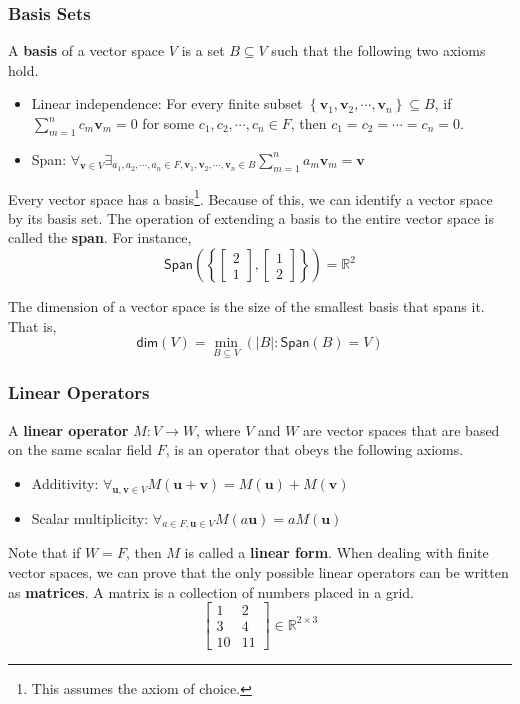 \documentclass[10pt]{beamer}
\begin{document}
\begin{frame}
  \frametitle{Basis Sets}
  A \textbf{basis} of a vector space $V$ is a set $B \subseteq V$ such that the following two axioms hold.
  \begin{itemize}
  \item Linear independence: For every finite subset $\left\{\mathbf{v}_1, \mathbf{v}_2, \cdots, \mathbf{v}_n\right\} \subseteq B$, if $\sum_{m=1}^{n}c_m\mathbf{v}_m = 0$ for some $c_1, c_2, \cdots, c_n \in F$, then $c_1 = c_2 = \cdots = c_n = 0$.
  \item Span: $\forall_{\mathbf{v}\in V}\exists_{a_1,a_2, \cdots, a_n\in F, \mathbf{v}_1, \mathbf{v}_2, \cdots, \mathbf{v}_n\in B} \sum_{m = 1}^na_m\mathbf{v}_m = \mathbf{v}$
  \end{itemize}
  Every vector space has a basis\footnote{This assumes the axiom of choice.}. Because of this, we can identify a vector space by its basis set. The operation of extending a basis to the entire vector space is called the \textbf{span}. For instance,
  $$\mathsf{Span}\left(\left\{\left[\begin{matrix}
      2\\
      1
    \end{matrix}\right], \left[\begin{matrix}
      1\\
      2
    \end{matrix}\right]\right\}\right) = \mathbb{R}^2$$

  The dimension of a vector space is the size of the smallest basis that spans it. That is,
  $$\mathsf{dim}(V) = \min_{B\subseteq V}\left(\left|B\right| : \mathsf{Span}(B) = V\right)$$
\end{frame}

\begin{frame}
  \frametitle{Linear Operators}
  A \textbf{linear operator} $M: V \rightarrow W$, where $V$ and $W$ are vector spaces that are based on the same scalar field $F$, is an operator that obeys the following axioms.
  \begin{itemize}
  \item Additivity: $\forall_{\mathbf{u}, \mathbf{v}\in V} M(\mathbf{u} + \mathbf{v}) = M(\mathbf{u}) + M(\mathbf{v})$
  \item Scalar multiplicity: $\forall_{a\in F, \mathbf{u}\in V}M(a\mathbf{u}) = aM(\mathbf{u})$
  \end{itemize}
  Note that if $W = F$, then $M$ is called a \textbf{linear form}. When dealing with finite vector spaces, we can prove that the only possible linear operators can be written as \textbf{matrices}. A matrix is a collection of numbers placed in a grid.
  $$\left[\begin{matrix}
      1 & 2\\
      3 & 4\\
      10 & 11
    \end{matrix}\right] \in \mathbb{R}^{2\times 3}$$
\end{frame}
\end{document}
